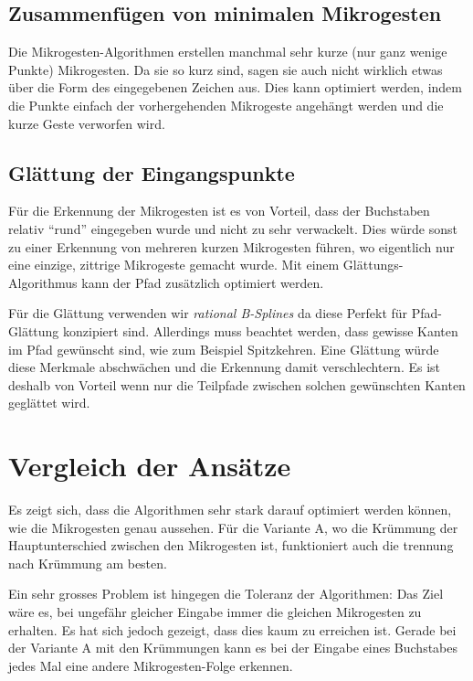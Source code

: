 

\subsection{Zusammenfügen von minimalen Mikrogesten}
Die Mikrogesten-Algorithmen erstellen manchmal sehr kurze (nur ganz wenige Punkte) Mikrogesten. Da sie so kurz sind, sagen sie auch nicht wirklich etwas über die Form des eingegebenen Zeichen aus. Dies kann optimiert werden, indem die Punkte einfach der vorhergehenden Mikrogeste angehängt werden und die kurze Geste verworfen wird.

\subsection{Glättung der Eingangspunkte}\label{sec:Glaettung}
Für die Erkennung der Mikrogesten ist es von Vorteil, dass der Buchstaben relativ ``rund'' eingegeben wurde und nicht zu sehr verwackelt. Dies würde sonst zu einer Erkennung von mehreren kurzen Mikrogesten führen, wo eigentlich nur eine einzige, zittrige Mikrogeste gemacht wurde. Mit einem Glättungs-Algorithmus kann der Pfad zusätzlich optimiert werden. 

Für die Glättung verwenden wir \emph{rational B-Splines} \cite[S. 454]{smoothing_book} da diese Perfekt für Pfad-Glättung konzipiert sind. Allerdings muss beachtet werden, dass gewisse Kanten im Pfad gewünscht sind, wie zum Beispiel Spitzkehren. Eine Glättung würde diese Merkmale abschwächen und die Erkennung damit verschlechtern. Es ist deshalb von Vorteil wenn nur die Teilpfade zwischen solchen gewünschten Kanten geglättet wird.



\section{Vergleich der Ansätze}
Es zeigt sich, dass die Algorithmen sehr stark darauf optimiert werden können, wie die Mikrogesten genau aussehen. Für die Variante A, wo die Krümmung der Hauptunterschied zwischen den Mikrogesten ist, funktioniert auch die trennung nach Krümmung am besten.

Ein sehr grosses Problem ist hingegen die Toleranz der Algorithmen: Das Ziel wäre es, bei ungefähr gleicher Eingabe immer die gleichen Mikrogesten zu erhalten. Es hat sich jedoch gezeigt, dass dies kaum zu erreichen ist. Gerade bei der Variante A mit den Krümmungen kann es bei der Eingabe eines Buchstabes jedes Mal eine andere Mikrogesten-Folge erkennen. 

